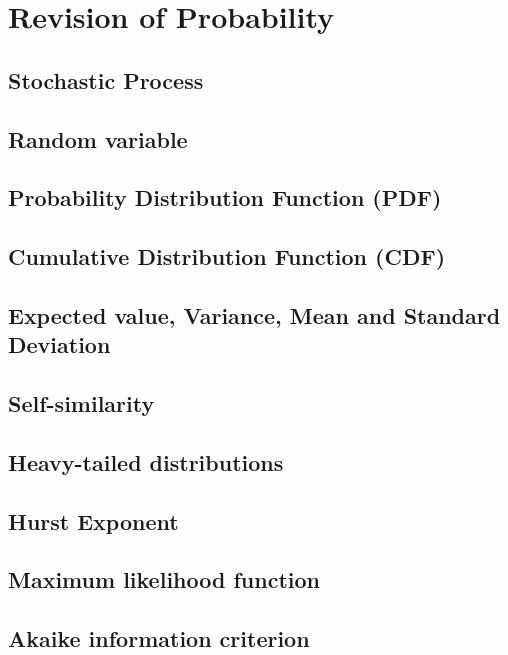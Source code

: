 

\chapter{Revision of Probability}
\label{ap:revision-probability}

\section{Stochastic Process}

\section{Random variable}

\section{Probability Distribution Function (PDF)}

\section{Cumulative Distribution Function (CDF)}

\section{Expected value, Variance, Mean and Standard Deviation}

\section{Self-similarity}

\section{Heavy-tailed distributions}

\section{Hurst Exponent}

\section{Maximum likelihood function}

\section{Akaike information criterion}


